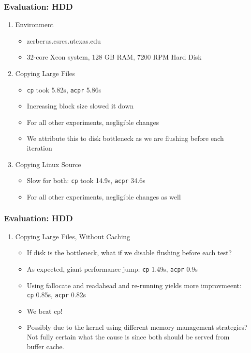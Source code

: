 \documentclass{beamer}
\begin{document}
\begin{frame}
\frametitle{Evaluation: HDD}
\begin{enumerate}[1.]
	\item{Environment}
	\begin{itemize}
		\item zerberus.csres.utexas.edu
		\item 32-core Xeon system, 128 GB RAM, 7200 RPM Hard Disk
	\end{itemize}
	\item{Copying Large Files}
	\begin{itemize}
		\item \texttt{cp} took 5.82s, \texttt{acpr} 5.86s
		\item Increasing block size slowed it down
		\item For all other experiments, negligible changes
		\item We attribute this to disk bottleneck as we are flushing before each iteration
	\end{itemize}
	\item{Copying Linux Source}
	\begin{itemize}
		\item Slow for both: \texttt{cp} took 14.9s, \texttt{acpr} 34.6s
		\item For all other experiments, negligible changes as well
	\end{itemize}
\end{enumerate}
\end{frame}

\begin{frame}
\frametitle{Evaluation: HDD}
\begin{enumerate}[1.]
\item{Copying Large Files, Without Caching}
\begin{itemize}
	\item If disk is the bottleneck, what if we disable flushing before each test?
	\item As expected, giant performance jump: \texttt{cp} 1.49s, \texttt{acpr} 0.9s
	\item Using fallocate and readahead and re-running yields more improvmeent: \texttt{cp} 0.85s, \texttt{acpr} 0.82s
	\item We beat cp!
	\item Possibly due to the kernel using different memory management strategies? Not fully certain what the cause is since both should be served from buffer cache.
\end{itemize}
\end{enumerate}
\end{frame}
\end{document}
